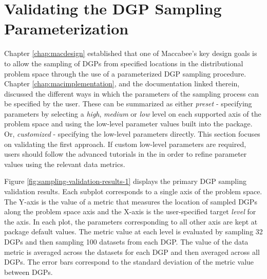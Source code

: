 \documentclass[../main.tex]{subfiles}
\begin{document}
\section{Validating the DGP Sampling Parameterization}
\label{sec:validation-dgp-sampling}

Chapter \ref{chap:macdesign} established that one of Maccabee's key design goals is to allow the sampling of DGPs from specified locations in the distributional problem space through the use of a parameterized DGP sampling procedure. Chapter \ref{chap:macimplementation}, and the documentation linked therein, discussed the different ways in which the parameters of the sampling process can be specified by the user. These can be summarized as either \textit{preset} - specifying parameters by selecting a \textit{high}, \textit{medium} or \textit{low} level on each supported axis of the problem space and using the low-level parameter values built into the package. Or, \textit{customized} - specifying the low-level parameters directly. This section focuses on validating the first approach. If custom low-level parameters are required, users should follow the advanced tutorials in the  in order to refine parameter values using the relevant data metrics.

\vspace{\baselineskip}

Figure \ref{fig:sampling-validation-results-1} displays the primary DGP sampling validation results. Each subplot corresponds to a single axis of the problem space. The Y-axis is the value of a metric that measures the location of sampled DGPs along the problem space axis and the X-axis is the user-specified target \textit{level} for the axis. In each plot, the parameters corresponding to all other axis are kept at package default values. The metric value at each level is evaluated by sampling 32 DGPs and then sampling 100 datasets from each DGP. The value of the data metric is averaged across the datasets for each DGP and then averaged across all DGPs. The error bars correspond to the standard deviation of the metric value between DGPs.
\end{document}
